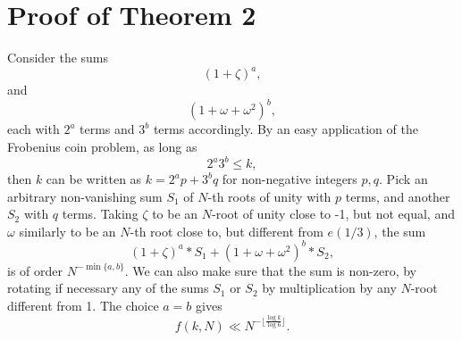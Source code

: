 \documentclass[10pt,a4paper]{amsart}
\begin{document}
\section{Proof of Theorem 2}
Consider the sums
\begin{equation}
    (1+\zeta)^a,
\end{equation}
and
\begin{equation}\label{sum1}
    (1+\omega+\omega^2)^b,
\end{equation}
each with $2^a$ terms and $3^b$ terms accordingly. By an easy application of the Frobenius coin problem, as long as
\begin{equation}\label{sum2}
    2^a3^b\leq k,
\end{equation} 
then $k$ can be written as $k=2^ap+3^bq$ for non-negative integers $p,q$. Pick an arbitrary non-vanishing sum $S_1$ of $N$-th roots of unity with $p$ terms, and another $S_2$ with $q$ terms. Taking $\zeta$ to be an $N$-root of unity close to -1, but not equal, and $\omega$ similarly to be an $N$-th root close to, but different from $e(1/3)$, the sum
$$ (1+\zeta)^a*S_1+(1+\omega+\omega^2)^b*S_2,  $$
is of order $N^{-\min\{a,b\}}$. We can also make sure that the sum is non-zero, by rotating if necessary any of the sums $S_1$ or $S_2$ by multiplication by any $N$-root different from 1. The choice $a=b$ gives
$$ f(k,N)\ll N^{-\lfloor \frac{\log k}{\log 6} \rfloor}.  $$
\end{document}
